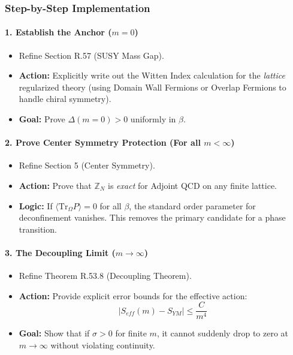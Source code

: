 \subsubsection{Step-by-Step Implementation}

\paragraph{1. Establish the Anchor ($m=0$)}
\begin{itemize}
    \item Refine Section R.57 (SUSY Mass Gap).
    \item \textbf{Action:} Explicitly write out the Witten Index calculation for the \textit{lattice} regularized theory (using Domain Wall Fermions or Overlap Fermions to handle chiral symmetry).
    \item \textbf{Goal:} Prove $\Delta(m=0) > 0$ uniformly in $\beta$.
\end{itemize}

\paragraph{2. Prove Center Symmetry Protection (For all $m < \infty$)}
\begin{itemize}
    \item Refine Section 5 (Center Symmetry).
    \item \textbf{Action:} Prove that $\mathbb{Z}_N$ is \textit{exact} for Adjoint QCD on any finite lattice.
    \item \textbf{Logic:} If $\langle \mathrm{Tr}_\Omega P \rangle = 0$ for all $\beta$, the standard order parameter for deconfinement vanishes. This removes the primary candidate for a phase transition.
\end{itemize}

\paragraph{3. The Decoupling Limit ($m \to \infty$)}
\begin{itemize}
    \item Refine Theorem R.53.8 (Decoupling Theorem).
    \item \textbf{Action:} Provide explicit error bounds for the effective action:
    \[ |S_{eff}(m) - S_{YM}| \le \frac{C}{m^4} \]
    \item \textbf{Goal:} Show that if $\sigma > 0$ for finite $m$, it cannot suddenly drop to zero at $m \to \infty$ without violating continuity.
\end{itemize}

